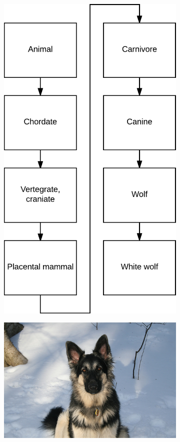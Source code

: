 \begin{figure}[H]
\begin{subfigure}[b]{0.20\textwidth}
        \includegraphics[width=\textwidth]{Figs/Problem/wolf_hier.png}
        \caption{}\label{fig:interhier1b}
    \end{subfigure}
        \begin{subfigure}[b]{0.25\textwidth}
        \center
        \includegraphics[width=\textwidth]{Figs/Problem/germanshepherd.jpeg}

\end{subfigure}
\end{figure}
